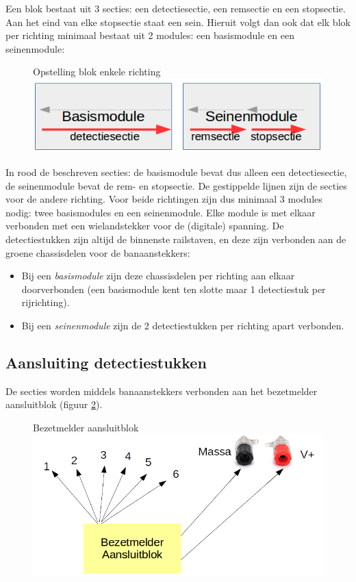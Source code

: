 \documentclass[12pt,a4paper]{report}
\begin{document}
Een blok bestaat uit 3 secties: een detectiesectie, een remsectie en een stopsectie. Aan het eind van elke stopsectie staat een sein. Hieruit volgt dan ook dat elk blok per richting minimaal bestaat uit 2 modules: een basismodule en een seinenmodule:

\begin{figure}[!ht]
  \captionbox
  {Opstelling blok enkele richting\label{im:3secties}}
  {\includegraphics[scale=1.0]{images/rcu_3_secties}}
\end{figure}

In rood de beschreven secties: de basismodule bevat dus alleen een detectiesectie, de seinenmodule bevat de rem- en stopsectie. De gestippelde lijnen zijn de secties voor de andere richting.
Voor beide richtingen zijn dus minimaal 3 modules nodig: twee basismodules en een seinenmodule.
Elke module is met elkaar verbonden met een wielandstekker voor de (digitale) spanning. De detectiestukken zijn altijd de binnenste railstaven, en deze zijn verbonden aan de groene chassisdelen voor de banaanstekkers:
\begin{itemize}
\item Bij een \emph{basismodule} zijn deze chassisdelen per richting aan elkaar doorverbonden (een basismodule kent ten slotte maar 1 detectiestuk per rijrichting).
\item Bij een \emph{seinenmodule} zijn de 2 detectiestukken per richting apart verbonden.
\end{itemize}

\subsection{Aansluiting detectiestukken}
De secties worden middels banaanstekkers verbonden aan het bezetmelder aansluitblok (figuur \ref{im:rcu_bezetmelderblok}). 

\begin{figure}[h]
  \captionbox
  {Bezetmelder aansluitblok\label{im:rcu_bezetmelderblok}}
  {\includegraphics[scale=1.0]{images/rcu_bezetmelderblok}}
\end{figure}
\end{document}
